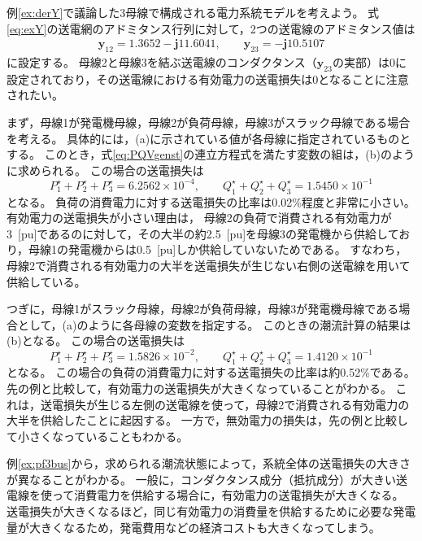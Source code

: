 \documentclass[tombow,dvipdfmx]{corona-a5-1.1}
\begin{document}
\begin{例}[データシートに基づく潮流計算]\label{ex:pf3bus}
例\ref{ex:derY}で議論した3母線で構成される電力系統モデルを考えよう。
式\ref{eq:exY}の送電網のアドミタンス行列に対して，2つの送電線のアドミタンス値は
\begin{align}\label{eq:rightlossless}
\bm{y}_{12} = 1.3652 - \bm{j} 11.6041, \qquad
\bm{y}_{23} =  - \bm{j} 10.5107
\end{align}
に設定する。
母線2と母線3を結ぶ送電線のコンダクタンス（$\bm{y}_{23}$の実部）は0に設定されており，その送電線における有効電力の送電損失は0となることに注意されたい。

まず，母線1が発電機母線，母線2が負荷母線，母線3がスラック母線である場合を考える。
具体的には，(a)に示されている値が各母線に指定されているものとする。
このとき，式\ref{eq:PQVgenst}の連立方程式を満たす変数の組は，(b)のように求められる。
この場合の送電損失は
\[
P_1^{\star} + P_2^{\star} + P_3^{\star} = 6.2562\times 10^{-4},
\qquad 
Q_1^{\star} + Q_2^{\star} + Q_3^{\star} =1.5450  \times 10^{-1}
\]
となる。
負荷の消費電力に対する送電損失の比率は0.02\%程度と非常に小さい。
有効電力の送電損失が小さい理由は，
母線2の負荷で消費される有効電力が3~[pu]であるのに対して，その大半の約2.5~[pu]を母線3の発電機から供給しており，母線1の発電機からは0.5~[pu]しか供給していないためである。
すなわち，母線2で消費される有効電力の大半を送電損失が生じない右側の送電線を用いて供給している。

つぎに，母線1がスラック母線，母線2が負荷母線，母線3が発電機母線である場合として，(a)のように各母線の変数を指定する。
このときの潮流計算の結果は(b)となる。
この場合の送電損失は
\[
P_1^{\star} + P_2^{\star} + P_3^{\star} = 1.5826 \times 10^{-2},
\qquad 
Q_1^{\star} + Q_2^{\star} + Q_3^{\star} =1.4120  \times 10^{-1}
\]
となる。
この場合の負荷の消費電力に対する送電損失の比率は約0.52\%である。
先の例と比較して，有効電力の送電損失が大きくなっていることがわかる。
これは，送電損失が生じる左側の送電線を使って，母線2で消費される有効電力の大半を供給したことに起因する。
一方で，無効電力の損失は，先の例と比較して小さくなっていることもわかる。
\end{例}

例\ref{ex:pf3bus}から，求められる潮流状態によって，系統全体の送電損失の大きさが異なることがわかる。
一般に，コンダクタンス成分（抵抗成分）が大きい送電線を使って消費電力を供給する場合に，有効電力の送電損失が大きくなる。
送電損失が大きくなるほど，同じ有効電力の消費量を供給するために必要な発電量が大きくなるため，発電費用などの経済コストも大きくなってしまう。
\end{document}
